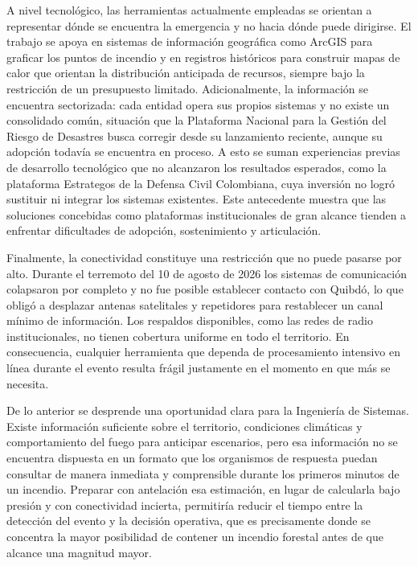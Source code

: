 A nivel tecnológico, las herramientas actualmente empleadas se orientan a representar dónde se encuentra la emergencia y no hacia dónde puede dirigirse. El trabajo se apoya en sistemas de información geográfica como ArcGIS para graficar los puntos de incendio y en registros históricos para construir mapas de calor que orientan la distribución anticipada de recursos, siempre bajo la restricción de un presupuesto limitado. Adicionalmente, la información se encuentra sectorizada: cada entidad opera sus propios sistemas y no existe un consolidado común, situación que la Plataforma Nacional para la Gestión del Riesgo de Desastres busca corregir desde su lanzamiento reciente, aunque su adopción todavía se encuentra en proceso. A esto se suman experiencias previas de desarrollo tecnológico que no alcanzaron los resultados esperados, como la plataforma Estrategos de la Defensa Civil Colombiana, cuya inversión no logró sustituir ni integrar los sistemas existentes. Este antecedente muestra que las soluciones concebidas como plataformas institucionales de gran alcance tienden a enfrentar dificultades de adopción, sostenimiento y articulación.

Finalmente, la conectividad constituye una restricción que no puede pasarse por alto. Durante el terremoto del 10 de agosto de 2026 los sistemas de comunicación colapsaron por completo y no fue posible establecer contacto con Quibdó, lo que obligó a desplazar antenas satelitales y repetidores para restablecer un canal mínimo de información. Los respaldos disponibles, como las redes de radio institucionales, no tienen cobertura uniforme en todo el territorio. En consecuencia, cualquier herramienta que dependa de procesamiento intensivo en línea durante el evento resulta frágil justamente en el momento en que más se necesita.

De lo anterior se desprende una oportunidad clara para la Ingeniería de Sistemas. Existe información suficiente sobre el territorio, condiciones climáticas y comportamiento del fuego para anticipar escenarios, pero esa información no se encuentra dispuesta en un formato que los organismos de respuesta puedan consultar de manera inmediata y comprensible durante los primeros minutos de un incendio. Preparar con antelación esa estimación, en lugar de calcularla bajo presión y con conectividad incierta, permitiría reducir el tiempo entre la detección del evento y la decisión operativa, que es precisamente donde se concentra la mayor posibilidad de contener un incendio forestal antes de que alcance una magnitud mayor.


